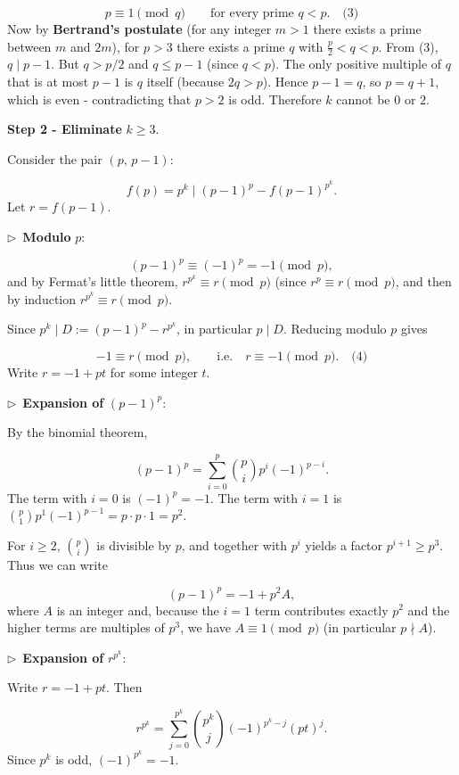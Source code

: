 \documentclass{llmxive}
\providecommand{\compactbullet}[1]{\par\noindent$\triangleright$~#1\par}
\begin{document}
\[
p\equiv 1\pmod q \qquad\text{for every prime } q<p. \quad\text{(3)}
\]
Now by \textbf{Bertrand's postulate} (for any integer \(m>1\) there exists a prime between \(m\) and \(2m\)), for \(p>3\) there exists a prime \(q\) with \(\frac{p}{2}<q<p\). From (3), \(q\mid p-1\). But \(q>p/2\) and \(q\le p-1\) (since \(q<p\)). The only positive multiple of \(q\) that is at most \(p-1\) is \(q\) itself (because \(2q>p\)). Hence \(p-1=q\), so \(p=q+1\), which is even - contradicting that \(p>2\) is odd. Therefore \(k\) cannot be \(0\) or \(2\).\par
\smallskip
\textbf{Step 2 - Eliminate }\(k\ge3\).\textbf{}\par
Consider the pair \((p,\,p-1)\):\par
\[
f(p)=p^{k}\mid (p-1)^{p} - f(p-1)^{p^{k}}.
\]
Let \(r = f(p-1)\).\par
\compactbullet{\textbf{Modulo }\(p\):\textbf{}}
\[
  (p-1)^{p}\equiv (-1)^{p} = -1\pmod p,
  \]
and by Fermat's little theorem, \(r^{p^{k}}\equiv r\pmod p\) (since \(r^{p}\equiv r\pmod p\), and then by induction \(r^{p^{k}}\equiv r\pmod p\).\par
Since \(p^{k}\mid D := (p-1)^{p} - r^{p^{k}}\), in particular \(p\mid D\). Reducing modulo \(p\) gives\par
\[
  -1 \equiv r \pmod p,\qquad\text{i.e.}\quad r\equiv -1\pmod p. \quad\text{(4)}
  \]
Write \(r = -1 + p t\) for some integer \(t\).\par
\compactbullet{\textbf{Expansion of }\((p-1)^{p}\):\textbf{}}
By the binomial theorem,\par
\[
  (p-1)^{p} = \sum_{i=0}^{p}\binom{p}{i}p^{i}(-1)^{p-i}.
  \]
The term with \(i=0\) is \((-1)^{p} = -1\). The term with \(i=1\) is \(\binom{p}{1}p^{1}(-1)^{p-1} = p\cdot p\cdot1 = p^{2}\).\par
For \(i\ge2\), \(\binom{p}{i}\) is divisible by \(p\), and together with \(p^{i}\) yields a factor \(p^{i+1}\ge p^{3}\). Thus we can write\par
\[
  (p-1)^{p} = -1 + p^{2} A,
  \]
where \(A\) is an integer and, because the \(i=1\) term contributes exactly \(p^{2}\) and the higher terms are multiples of \(p^{3}\), we have \(A\equiv 1\pmod p\) (in particular \(p\nmid A\)).\par
\compactbullet{\textbf{Expansion of }\(r^{p^{k}}\):\textbf{}}
Write \(r = -1 + p t\). Then\par
\[
  r^{p^{k}} = \sum_{j=0}^{p^{k}}\binom{p^{k}}{j}(-1)^{p^{k}-j}(p t)^{j}.
  \]
Since \(p^{k}\) is odd, \((-1)^{p^{k}} = -1\).\par
\end{document}
